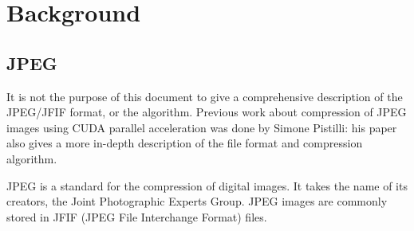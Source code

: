 \chapter{Background} \label{Background}

\section{JPEG}

It is not the purpose of this document to give a comprehensive description of the JPEG/JFIF format, or the algorithm. Previous work about compression of JPEG images using CUDA parallel acceleration was done by Simone Pistilli: his paper \cite{simonepap} also gives a more in-depth description of the file format and compression algorithm.

JPEG is a standard for the compression of digital images. It takes the name of its creators, the Joint Photographic Experts Group. JPEG images are commonly stored in JFIF (JPEG File Interchange Format) files.

